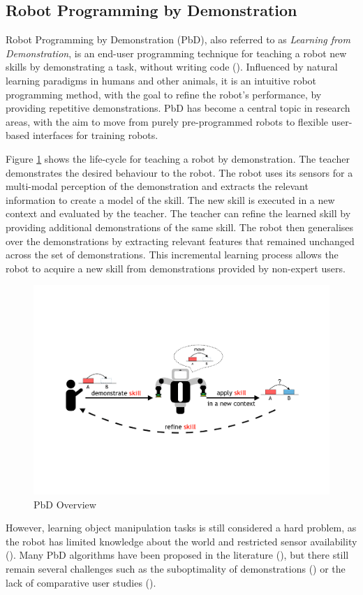\subsection{Robot Programming by Demonstration}
Robot Programming by Demonstration (PbD), also referred to as \textit{Learning from Demonstration}, is an end-user programming technique for teaching a robot new skills by demonstrating a task, without writing code (\cite{billard2008robot}).
Influenced by natural learning paradigms in humans and other animals, it is an intuitive robot programming method, with the goal to refine the robot's performance, by providing repetitive demonstrations.
PbD has become a central topic in research areas, with the aim to move from purely pre-programmed robots to flexible user-based interfaces for training robots.

Figure \ref{fig:Principle Overview} shows the life-cycle for teaching a robot by demonstration.
The teacher demonstrates the desired behaviour to the robot.
The robot uses its sensors for a multi-modal perception of the demonstration and extracts the relevant information to create a model of the skill.
The new skill is executed in a new context and evaluated by the teacher.
The teacher can refine the learned skill by providing additional demonstrations of the same skill.
The robot then generalises over the demonstrations by extracting relevant features that remained unchanged across the set of demonstrations.
This incremental learning process allows the robot to acquire a new skill from demonstrations provided by non-expert users.

\begin{figure}[h]
	\centering
	\includegraphics[width=0.5\linewidth]{figures/PbD-Overview}
	\caption{PbD Overview}
	\label{fig:Principle Overview}
\end{figure}

However, learning object manipulation tasks is still considered a hard problem, as the robot has limited knowledge about the world and restricted sensor availability (\cite{ekvall2008robot}).
Many PbD algorithms have been proposed in the literature (\cite{argall2009survey,billing2010formalism}), but there still remain several challenges such as the suboptimality of demonstrations (\cite{chen2003programing,kaiser1995obtaining}) or the lack of comparative user studies (\cite{suay2012practical}).

